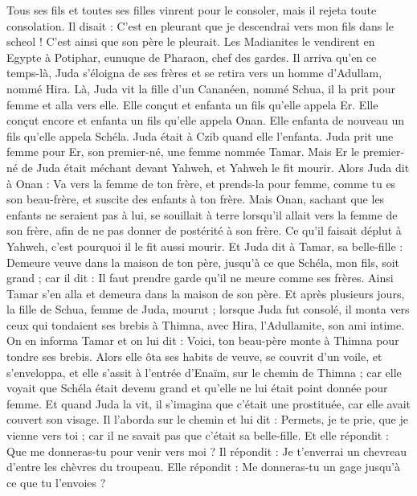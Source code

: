 \begin{multicols}{2}
Tous ses fils et toutes ses filles vinrent pour le consoler, mais il rejeta toute consolation. Il disait : C’est en pleurant que je descendrai vers mon fils dans le scheol ! C'est ainsi que son père le pleurait.
Les Madianites le vendirent en Egypte à Potiphar, eunuque de Pharaon, chef des gardes.
\VerseOne{}Il arriva qu’en ce temps-là, Juda s’éloigna de ses frères et se retira vers un homme d’Adullam, nommé Hira.
Là, Juda vit la fille d'un Cananéen, nommé Schua, il la prit pour femme et alla vers elle.
Elle conçut et enfanta un fils qu’elle appela Er.
Elle conçut encore et enfanta un fils qu’elle appela Onan.
Elle enfanta de nouveau un fils qu’elle appela Schéla. Juda était à Czib quand elle l’enfanta.
Juda prit une femme pour Er, son premier-né, une femme nommée Tamar.
Mais Er le premier-né de Juda était méchant devant Yahweh, et Yahweh le fit mourir.
Alors Juda dit à Onan : Va vers la femme de ton frère, et prends-la pour femme, comme tu es son beau-frère, et suscite des enfants à ton frère.
Mais Onan, sachant que les enfants ne seraient pas à lui, se souillait à terre lorsqu’il allait vers la femme de son frère, afin de ne pas donner de postérité à son frère.
Ce qu'il faisait déplut à Yahweh, c'est pourquoi il le fit aussi mourir.
Et Juda dit à Tamar, sa belle-fille : Demeure veuve dans la maison de ton père, jusqu'à ce que Schéla, mon fils, soit grand ; car il dit : Il faut prendre garde qu'il ne meure comme ses frères. Ainsi Tamar s'en alla et demeura dans la maison de son père.
Et après plusieurs jours, la fille de Schua, femme de Juda, mourut ; lorsque Juda fut consolé, il monta vers ceux qui tondaient ses brebis à Thimna, avec Hira, l’Adullamite, son ami intime.
On en informa Tamar et on lui dit : Voici, ton beau-père monte à Thimna pour tondre ses brebis.
Alors elle ôta ses habits de veuve, se couvrit d'un voile, et s'enveloppa, et elle s’assit à l’entrée d’Enaïm, sur le chemin de Thimna ; car elle voyait que Schéla était devenu grand et qu’elle ne lui était point donnée pour femme.
Et quand Juda la vit, il s'imagina que c'était une prostituée, car elle avait couvert son visage.
Il l’aborda sur le chemin et lui dit : Permets, je te prie, que je vienne vers toi ; car il ne savait pas que c’était sa belle-fille. Et elle répondit : Que me donneras-tu pour venir vers moi ?
Il répondit : Je t'enverrai un chevreau d'entre les chèvres du troupeau. Elle répondit : Me donneras-tu un gage jusqu'à ce que tu l'envoies ?

\end{multicols}
